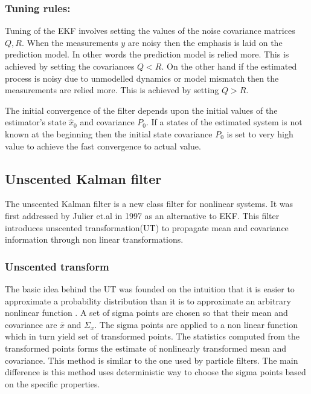 \subsubsection{Tuning rules:}
\label{subsec:tune_ekf}
Tuning of the EKF involves setting the values of the noise covariance matrices $Q,R$. When the measurements $y$ are noisy then the emphasis is laid on the prediction model. In other words the prediction model is relied more. This is achieved by setting the covariances $Q<R$. On the other hand if the estimated process is noisy due to unmodelled dynamics or model mismatch then the measurements are relied more. This is achieved by setting $Q>R$.

The initial convergence of the filter depends upon the initial values of the estimator's state $\hat x_0$ and covariance $P_0$. If a states of the estimated system is not known at the beginning then the initial state covariance $P_0$ is set to very high value to achieve the fast convergence to actual value.

\subsection{Unscented Kalman filter}
The unscented Kalman filter is a new class filter for nonlinear systems. It was first addressed by Julier et.al in 1997 \citep{jul97} as an alternative to EKF. This filter introduces unscented transformation(UT) to propagate mean and covariance information through non linear transformations.

\subsubsection{Unscented transform}
The basic idea behind the UT was founded on the intuition that it is easier to approximate a probability distribution than it is to approximate an arbitrary nonlinear function \citep{jul04}. A set of sigma points are chosen so that their mean and covariance are $\bar x$ and $\Sigma_x$. The sigma points are applied to a non linear function which in turn yield set of transformed points. The statistics computed from the transformed points forms the estimate of nonlinearly transformed mean and covariance. This method is similar to the one used by particle filters. The main difference is this method uses deterministic way to choose the sigma points based on the specific properties. 

